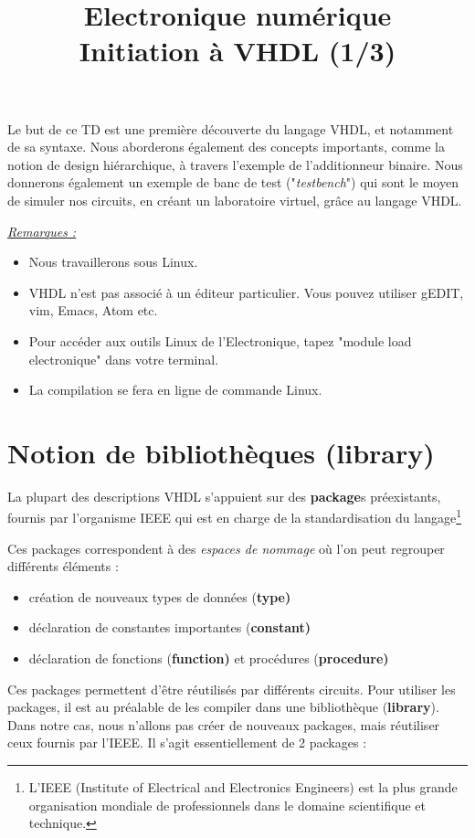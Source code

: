 \documentclass[a4paper,11pt]{article}
\title{{\Huge Electronique numérique}\\Initiation à VHDL (1/3)}
\date{}
\begin{document}
\maketitle
Le but de ce TD est une première découverte du langage VHDL, et notamment de sa syntaxe.
Nous aborderons également des concepts importants, comme la notion de design hiérarchique, à travers l'exemple de l'additionneur binaire.
Nous donnerons également un exemple de banc de test ("{\it testbench}") qui sont le moyen de simuler nos circuits, en créant un laboratoire virtuel,
grâce au langage VHDL.

{\it
\underline{Remarques :}
\begin{itemize}
  \item Nous travaillerons sous Linux.
  \item VHDL n'est pas associé  à un éditeur particulier. Vous pouvez utiliser gEDIT, vim, Emacs, Atom etc.
  \item Pour accéder aux outils Linux de l'Electronique, tapez "module load electronique" dans votre terminal.
  \item La compilation se fera en ligne de commande Linux. 
\end{itemize}

}

\section{Notion de bibliothèques (library)}
La plupart des descriptions VHDL s'appuient sur des \textbf{package}s préexistants, fournis par l'organisme IEEE qui est en charge de la standardisation du langage\footnote{L'IEEE (Institute of Electrical and Electronics Engineers) est la plus grande organisation mondiale de professionnels dans le domaine scientifique et
technique.}

Ces packages correspondent à des {\it espaces de nommage} où l'on peut regrouper différents éléments :
\begin{itemize}
  \item création de nouveaux types de données (\textbf{type)}
  \item déclaration de constantes importantes (\textbf{constant)}
  \item déclaration de fonctions (\textbf{function)} et procédures (\textbf{procedure)}
\end{itemize}
Ces packages permettent d'être réutilisés par différents circuits.
Pour utiliser les packages, il est au préalable de les compiler dans une bibliothèque (\textbf{library}). Dans notre cas, nous n'allons pas créer de nouveaux packages, mais réutiliser
ceux fournis par l'IEEE. Il s'agit essentiellement de 2 packages :
\end{document}

